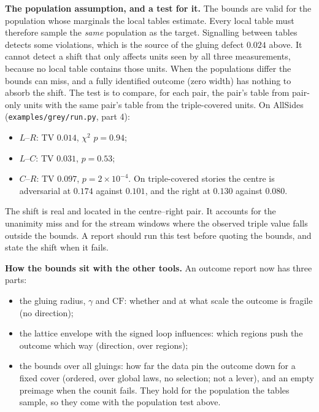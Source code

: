 \documentclass[11pt]{article}
\theoremstyle{definition}
\theoremstyle{remark}
\newcommand{\CF}{\mathrm{CF}}
\begin{document}
\textbf{The population assumption, and a test for it.} The bounds are valid for the population whose marginals the local tables estimate. Every local table must therefore sample the \emph{same} population as the target. Signalling between tables detects some violations, which is the source of the gluing defect $0.024$ above. It cannot detect a shift that only affects units seen by all three measurements, because no local table contains those units. When the populations differ the bounds can miss, and a fully identified outcome (zero width) has nothing to absorb the shift. The test is to compare, for each pair, the pair's table from pair-only units with the same pair's table from the triple-covered units. On AllSides (\texttt{examples/grey/run.py}, part 4):
\begin{itemize}
  \item $L$--$R$: TV $0.014$, $\chi^2$ $p=0.94$;
  \item $L$--$C$: TV $0.031$, $p=0.53$;
  \item $C$--$R$: TV $0.097$, $p=2\times10^{-4}$. On triple-covered stories the centre is adversarial at $0.174$ against $0.101$, and the right at $0.130$ against $0.080$.
\end{itemize}
The shift is real and located in the centre--right pair. It accounts for the unanimity miss and for the stream windows where the observed triple value falls outside the bounds. A report should run this test before quoting the bounds, and state the shift when it fails.

\textbf{How the bounds sit with the other tools.} An outcome report now has three parts:
\begin{itemize}
  \item the gluing radius, $\gamma$ and $\CF$: whether and at what scale the outcome is fragile (no direction);
  \item the lattice envelope with the signed loop influences: which regions push the outcome which way (direction, over regions);
  \item the bounds over all gluings: how far the data pin the outcome down for a fixed cover (ordered, over global laws, no selection; not a lever), and an empty preimage when the counit fails. They hold for the population the tables sample, so they come with the population test above.
\end{itemize}
\end{document}

